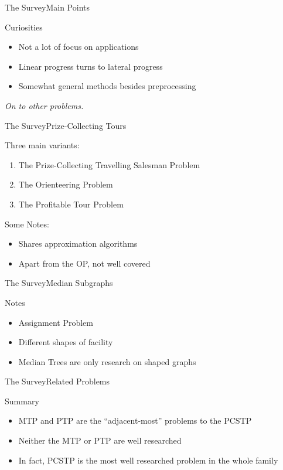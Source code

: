 \documentclass[rgb,dvipsnames]{beamer}
\begin{document}
\begin{frame}{The Survey}{Main Points}
  \begin{block}{Curiosities} \pause
  \begin{itemize}
  \item Not a lot of focus on applications
  \item Linear progress turns to lateral progress
  \item Somewhat general methods besides preprocessing
  \end{itemize}
\end{block}
\pause
\textit{On to other problems.}
\end{frame}

\begin{frame}{The Survey}{Prize-Collecting Tours}
  \begin{block}{Three main variants:}
    \begin{enumerate}
    \item The Prize-Collecting Travelling Salesman Problem
    \item The Orienteering Problem
    \item The Profitable Tour Problem
    \end{enumerate}
  \end{block}
  \pause
  \begin{block}{Some Notes:}
  \begin{itemize}
  \item Shares approximation algorithms
  \item Apart from the OP, not well covered
  \end{itemize}
\end{block}

\end{frame}

\begin{frame}{The Survey}{Median Subgraphs}
  \begin{block}{Notes}
    \begin{itemize}
    \item Assignment Problem
    \item Different shapes of facility
    \item Median Trees are only research on shaped graphs
  \end{itemize}
\end{block}
\end{frame}

\begin{frame}{The Survey}{Related Problems}
  \begin{block}{Summary}
  \begin{itemize}
  \item MTP and PTP are the ``adjacent-most'' problems to the PCSTP
  \item Neither the MTP or PTP are well researched
  \item In fact, PCSTP is the most well researched problem in the whole family
  \end{itemize}
\end{block}
\end{frame}
\end{document}
